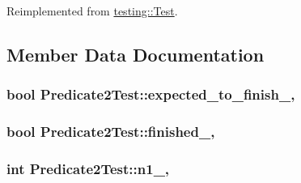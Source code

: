 Reimplemented from \hyperlink{classtesting_1_1_test_a5f0ab439802cbe0ef7552f1a9f791923}{testing\+::\+Test}.



\subsection{Member Data Documentation}
\subsubsection[{\texorpdfstring{expected\+\_\+to\+\_\+finish\+\_\+}{expected_to_finish_}}]{\setlength{\rightskip}{0pt plus 5cm}bool Predicate2\+Test\+::expected\+\_\+to\+\_\+finish\+\_\+\hspace{0.3cm}{\ttfamily [static]}, {\ttfamily [protected]}}\hypertarget{class_predicate2_test_a56cf1f0f556addd9a62e0644dc1a86fc}{}\label{class_predicate2_test_a56cf1f0f556addd9a62e0644dc1a86fc}
\subsubsection[{\texorpdfstring{finished\+\_\+}{finished_}}]{\setlength{\rightskip}{0pt plus 5cm}bool Predicate2\+Test\+::finished\+\_\+\hspace{0.3cm}{\ttfamily [static]}, {\ttfamily [protected]}}\hypertarget{class_predicate2_test_a30f4ef76d3004253078e767e5c653b85}{}\label{class_predicate2_test_a30f4ef76d3004253078e767e5c653b85}
\subsubsection[{\texorpdfstring{n1\+\_\+}{n1_}}]{\setlength{\rightskip}{0pt plus 5cm}int Predicate2\+Test\+::n1\+\_\+\hspace{0.3cm}{\ttfamily [static]}, {\ttfamily [protected]}}\hypertarget{class_predicate2_test_ac002d8e279b24e75906fd19973fc2170}{}\label{class_predicate2_test_ac002d8e279b24e75906fd19973fc2170}
